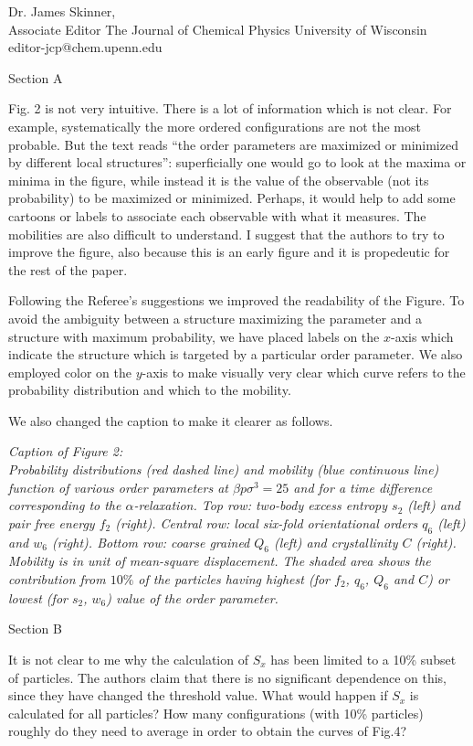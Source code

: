 \documentclass[a4paper, rebuttal, parskip=true, firsthead=false, fromemail=false, foldmarks=false]{scrlttr2}
\begin{document}
\begin{letter}{Dr. James Skinner,\\Associate Editor
The Journal of Chemical Physics
University of Wisconsin\\
editor-jcp@chem.upenn.edu }
\begin{quotationi}
Section A

Fig. 2 is not very intuitive. There is a lot of information which is not clear. For example, systematically the more ordered configurations are not the most probable. But the text reads ``the order parameters are maximized or minimized by different local structures'': superficially one would go to look at the maxima or minima in the figure, while instead it is the value of the observable (not its probability) to be maximized or minimized. Perhaps, it would help to add some cartoons or labels to associate each observable with what it measures. The mobilities are also difficult to understand. I suggest that the authors to try to improve the figure, also because this is an early figure and it is propedeutic for the rest of the paper.
\end{quotationi}

Following the Referee's suggestions we improved the readability of the Figure. To avoid the ambiguity between a structure maximizing the parameter and a structure with maximum probability, we have placed labels on the $x$-axis which indicate the structure which is targeted by a particular order parameter.
We also employed color on the $y$-axis to make visually very clear which curve refers to the probability distribution and which to the mobility.

We also changed the caption to make it clearer as follows. 

{\it Caption of Figure 2:\\
Probability distributions (red dashed line) and mobility (blue continuous line) function of various order parameters at $\beta p\sigma^3=25$ and for a time difference corresponding to the $\alpha$-relaxation. Top row: two-body excess entropy $s_2$ (left) and pair free energy $f_2$ (right). Central row: local six-fold orientational orders $q_6$ (left) and $w_6$ (right). Bottom row: coarse grained $Q_6$ (left) and crystallinity $C$ (right). Mobility is in unit of mean-square displacement. The shaded area shows the contribution from $10\%$ of the particles having highest (for $f_2$, $q_6$, $Q_6$ and $C$) or lowest (for $s_2$, $w_6$) value of the order parameter.
}


\begin{quotationi}
Section B

It is not clear to me why the calculation of $S_x$ has been limited to a 10\% subset of particles. The authors claim that there is no significant dependence on this, since they have changed the threshold value. What would happen if $S_x$ is calculated for all particles? How many configurations (with 10\% particles) roughly do they need to average in order to obtain the curves of Fig.4?
\end{quotationi}


\end{letter}
\end{document}
